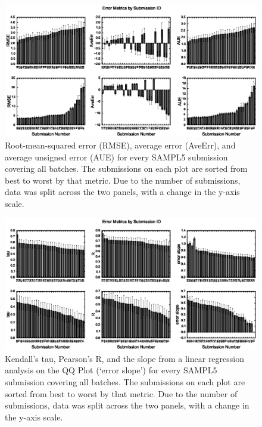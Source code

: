 \begin{figure} 
\includegraphics{ErrorMetrics.eps}
\caption{Root-mean-squared error (RMSE), average error (AveErr), and average unsigned error (AUE) for every SAMPL5 submission covering all batches. The submissions on each plot are sorted from best to worst by that metric. Due to the number of submissions, data was split across the two panels, with a change in the y-axis scale.}
\label{histogramsAverage}       
\end{figure}

\begin{figure} 
\includegraphics{CorrelationMetrics.eps}
\caption{Kendall's tau, Pearson's R, and the slope from a linear regression analysis on the QQ Plot (`error slope') for every SAMPL5 submission covering all batches. The submissions on each plot are sorted from best to worst by that metric. Due to the number of submissions, data was split across the two panels, with a change in the y-axis scale.}
\label{histogramsCorrelations}       
\end{figure}

